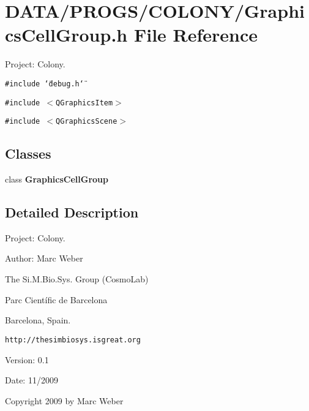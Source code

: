 \section{DATA/PROGS/COLONY/GraphicsCellGroup.h File Reference}
\label{GraphicsCellGroup_8h}
Project: Colony. 

{\tt \#include \char`\"{}debug.h\char`\"{}}\par
{\tt \#include $<$QGraphicsItem$>$}\par
{\tt \#include $<$QGraphicsScene$>$}\par
\subsection*{Classes}
\begin{CompactItemize}
\item 
class {\bf GraphicsCellGroup}
\end{CompactItemize}


\subsection{Detailed Description}
Project: Colony. 

\begin{Desc}
\item[Author:]Marc Weber\par
 The Si.M.Bio.Sys. Group (CosmoLab)\par
 Parc Científic de Barcelona\par
 Barcelona, Spain.\par
 {\tt http://thesimbiosys.isgreat.org} \end{Desc}
\begin{Desc}
\item[Version:]0.1 \end{Desc}
\begin{Desc}
\item[Date:]11/2009\end{Desc}
Copyright 2009 by Marc Weber 